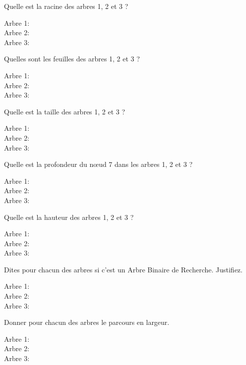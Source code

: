 \documentclass[a4paper, noanswers, addpoints, 12pt]{exam}
\begin{document}
\begin{questions}
\question[1] Quelle est la racine des arbres 1, 2 et 3 ?
\begin{description}
    \item[Arbre 1:]
    \item[Arbre 2:] 
    \item[Arbre 3:] 
\end{description}
\question[1] Quelles sont les feuilles des arbres 1, 2 et 3 ?
\begin{description}
    \item[Arbre 1:]
    \item[Arbre 2:] 
    \item[Arbre 3:] 
\end{description}
\question[1] Quelle est la taille des arbres 1, 2 et 3 ?
\begin{description}
    \item[Arbre 1:]
    \item[Arbre 2:] 
    \item[Arbre 3:] 
\end{description}
\question[1] Quelle est la profondeur du nœud 7 dans les arbres 1, 2 et 3 ?
\begin{description}
    \item[Arbre 1:]
    \item[Arbre 2:] 
    \item[Arbre 3:] 
\end{description}
\question[1] Quelle est la hauteur des arbres 1, 2 et 3 ?
\begin{description}
    \item[Arbre 1:]
    \item[Arbre 2:] 
    \item[Arbre 3:] 
\end{description}
\question[3] Dites pour chacun des arbres si c'est un Arbre Binaire de Recherche. Justifiez.
\begin{description}
    \item[Arbre 1:]
    \item[Arbre 2:] 
    \item[Arbre 3:] 
\end{description}
\question[3] Donner pour chacun des arbres le parcours en largeur.
\begin{description}
    \item[Arbre 1:]
    \item[Arbre 2:] 
    \item[Arbre 3:] 
\end{description}

\end{questions}
\end{document}
